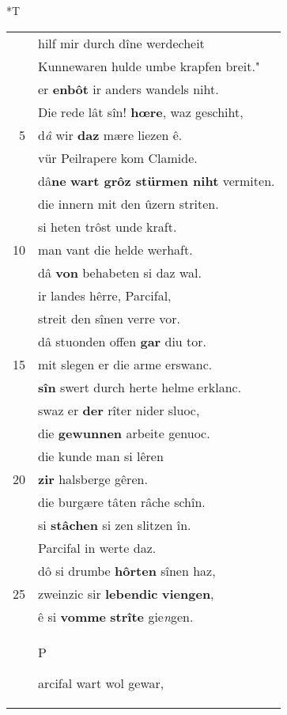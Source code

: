 \documentclass[8pt,a4paper,notitlepage]{article}
\begin{document}
\begin{table}[ht]
\begin{minipage}[t]{0.5\linewidth}
\end{minipage}
\hspace{0.5cm}
\begin{minipage}[t]{0.5\linewidth}
\small
\begin{center}*T
\end{center}
\begin{tabular}{rl}
 & hilf mir durch dîne werdecheit\\ 
 & Kunnewaren hulde umbe krapfen breit."\\ 
 & er \textbf{enbôt} ir anders wandels niht.\\ 
 & Die rede lât sîn! \textbf{hœre}, waz geschiht,\\ 
5 & d\textit{â} wir \textbf{daz} mære liezen ê.\\ 
 & vür Peilrapere kom Clamide.\\ 
 & dâ\textbf{ne} \textbf{wart grôz stürmen niht} vermiten.\\ 
 & die innern mit den ûzern striten.\\ 
 & si heten trôst unde kraft.\\ 
10 & man vant die helde werhaft.\\ 
 & dâ \textbf{von} behabeten si daz wal.\\ 
 & ir landes hêrre, Parcifal,\\ 
 & streit den sînen verre vor.\\ 
 & dâ stuonden offen \textbf{gar} diu tor.\\ 
15 & mit slegen er die arme erswanc.\\ 
 & \textbf{sîn} swert durch herte helme erklanc.\\ 
 & swaz er \textbf{der} rîter nider sluoc,\\ 
 & die \textbf{gewunnen} arbeite genuoc.\\ 
 & die kunde man si lêren\\ 
20 & \textbf{zir} halsberge gêren.\\ 
 & die burgære tâten râche schîn.\\ 
 & si \textbf{stâchen} si zen slitzen în.\\ 
 & Parcifal in werte daz.\\ 
 & dô si drumbe \textbf{hôrten} sînen haz,\\ 
25 & zweinzic sir \textbf{lebendic} \textbf{viengen},\\ 
 & ê si \textbf{vomme} \textbf{strîte} gie\textit{n}gen.\\ 
 & \begin{large}P\end{large}arcifal wart wol gewar,\\ 

\end{tabular}
\end{minipage}
\end{table}
\end{document}
